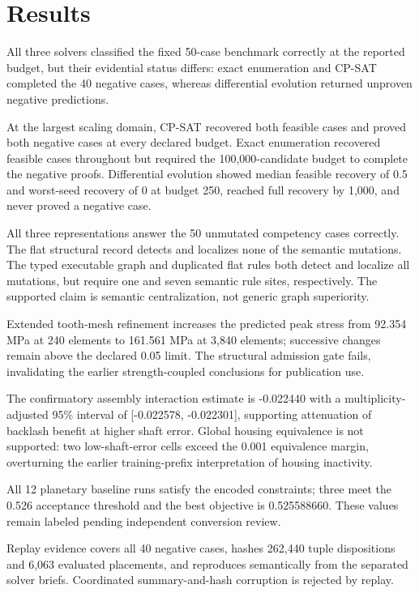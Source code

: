 \documentclass[preprint,12pt]{elsarticle}
\begin{document}
\section{Results}
All three solvers classified the fixed 50-case benchmark correctly at the reported budget, but their evidential status differs: exact enumeration and CP-SAT completed the 40 negative cases, whereas differential evolution returned unproven negative predictions.

At the largest scaling domain, CP-SAT recovered both feasible cases and proved both negative cases at every declared budget. Exact enumeration recovered feasible cases throughout but required the 100,000-candidate budget to complete the negative proofs. Differential evolution showed median feasible recovery of 0.5 and worst-seed recovery of 0 at budget 250, reached full recovery by 1,000, and never proved a negative case.

All three representations answer the 50 unmutated competency cases correctly. The flat structural record detects and localizes none of the semantic mutations. The typed executable graph and duplicated flat rules both detect and localize all mutations, but require one and seven semantic rule sites, respectively. The supported claim is semantic centralization, not generic graph superiority.

Extended tooth-mesh refinement increases the predicted peak stress from 92.354 MPa at 240 elements to 161.561 MPa at 3,840 elements; successive changes remain above the declared 0.05 limit. The structural admission gate fails, invalidating the earlier strength-coupled conclusions for publication use.

The confirmatory assembly interaction estimate is -0.022440 with a multiplicity-adjusted 95\% interval of [-0.022578, -0.022301], supporting attenuation of backlash benefit at higher shaft error. Global housing equivalence is not supported: two low-shaft-error cells exceed the 0.001 equivalence margin, overturning the earlier training-prefix interpretation of housing inactivity.

All 12 planetary baseline runs satisfy the encoded constraints; three meet the 0.526 acceptance threshold and the best objective is 0.525588660. These values remain labeled pending independent conversion review.

Replay evidence covers all 40 negative cases, hashes 262,440 tuple dispositions and 6,063 evaluated placements, and reproduces semantically from the separated solver briefs. Coordinated summary-and-hash corruption is rejected by replay.
\end{document}
